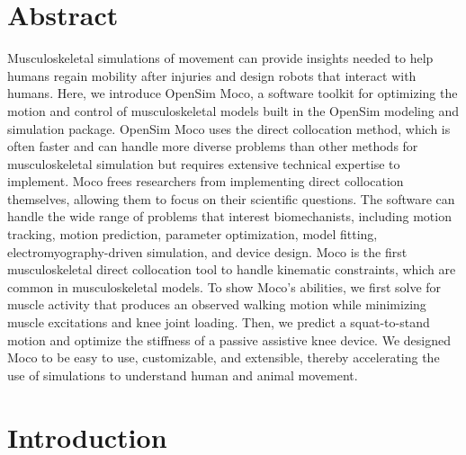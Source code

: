 \documentclass[10pt,letterpaper]{article}
\begin{document}
\section*{Abstract}
Musculoskeletal simulations of movement can provide insights needed to help humans regain mobility after injuries and design robots that interact with humans. Here, we introduce OpenSim Moco, a software toolkit for optimizing the motion and control of musculoskeletal models built in the OpenSim modeling and simulation package. OpenSim Moco uses the direct collocation method, which is often faster and can handle more diverse problems than other methods for musculoskeletal simulation but requires extensive technical expertise to implement. Moco frees researchers from implementing direct collocation themselves, allowing them to focus on their scientific questions. The software can handle the wide range of problems that interest biomechanists, including motion tracking, motion prediction, parameter optimization, model fitting, electromyography-driven simulation, and device design. Moco is the first musculoskeletal direct collocation tool to handle kinematic constraints, which are common in musculoskeletal models. To show Moco's abilities, we first solve for muscle activity that produces an observed walking motion while minimizing muscle excitations and knee joint loading. Then, we predict a squat-to-stand motion and optimize the stiffness of a passive assistive knee device. We designed Moco to be easy to use, customizable, and extensible, thereby accelerating the use of simulations to understand human and animal movement.




\section*{Introduction}
\end{document}
